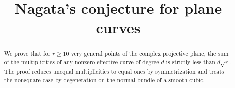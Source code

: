 \documentclass[11pt,a4paper]{amsart}
\title{Nagata's conjecture for plane curves}
\author{}
\date{}
\begin{document}
\begin{abstract}
We prove that for $r\geq10$ very general points of the complex projective plane, the sum of the multiplicities of any nonzero effective curve of degree $d$ is strictly less than $d\sqrt r$. The proof reduces unequal multiplicities to equal ones by symmetrization and treats the nonsquare case by degeneration on the normal bundle of a smooth cubic.
\end{abstract}

\maketitle








\printbibliography
\end{document}
